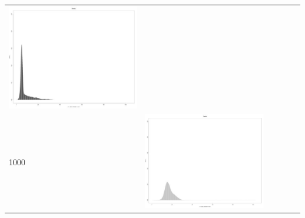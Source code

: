 \begin{table}[htbp]
{\begin{tabular}{l | ccccc}
\begin{minipage}{.15\textwidth}
     			 	\includegraphics[width=\linewidth]{images/mema-dens-graph/I10}
    				 \end{minipage}\\	
		1000   &	 \begin{minipage}{.15\textwidth}\vspace{2pt}     							
     			 	\includegraphics[width=\linewidth]{images/mema-dens-graph/I4}
    				 \end{minipage}
    			   &	 \begin{minipage}{.15\textwidth}\vspace{2pt}     							

\end{minipage}
\end{tabular}}
\end{table}
